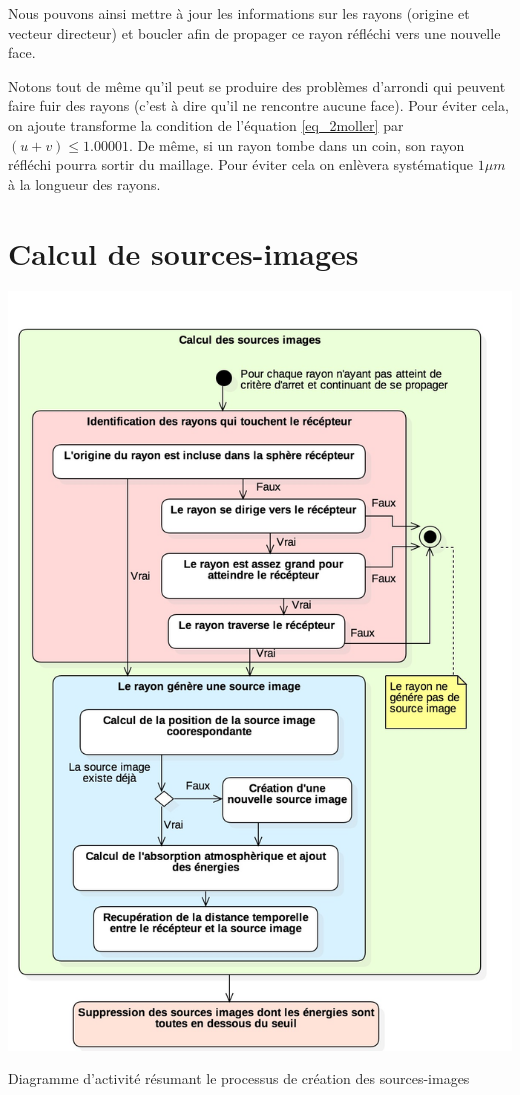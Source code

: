 Nous pouvons ainsi mettre à jour les informations sur les rayons (origine et vecteur directeur) et boucler afin de propager ce rayon réfléchi vers une nouvelle face.

Notons tout de même qu'il peut se produire des problèmes d'arrondi qui peuvent faire fuir des rayons (c'est à dire qu'il ne rencontre aucune face). Pour éviter cela, on ajoute transforme la condition de l'équation \ref{eq_2moller} par $(u+v)\leqslant1.00001$. De même, si un rayon tombe dans un coin, son rayon réfléchi pourra sortir du maillage. Pour éviter cela on enlèvera systématique $1\mu m$ à la longueur des rayons.

\section{Calcul de sources-images} \label{sect_si}

\begin{figureth}
	\includegraphics[width=0.8\linewidth]{images/DiagSi}
	\caption{Diagramme d'activité résumant le processus de création des sources-images}
	\label{DiagSi}
\end{figureth}

